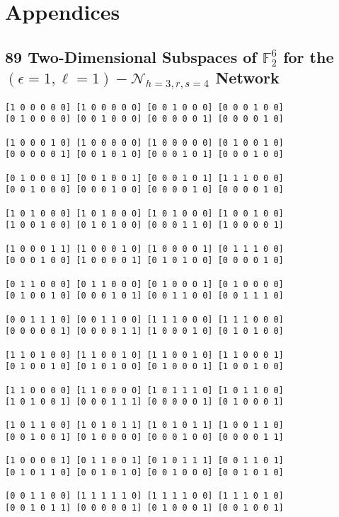 \chapter{Appendices} \label{chap:appendix}

\section{89 Two-Dimensional Subspaces of $\ensuremath{\mathbb{F}}_{2}^{6}$
for the $\left(\epsilon=1,\ell=1\right)-\mathcal{N}_{h=3,r,s=4}$
Network \label{sec:89-Two-Dimensional-Subspaces}}

\begin{lstlisting}
[1 0 0 0 0 0] [1 0 0 0 0 0] [0 0 1 0 0 0] [0 0 0 1 0 0] 
[0 1 0 0 0 0] [0 0 1 0 0 0] [0 0 0 0 0 1] [0 0 0 0 1 0] 

[1 0 0 0 1 0] [1 0 0 0 0 0] [1 0 0 0 0 0] [0 1 0 0 1 0] 
[0 0 0 0 0 1] [0 0 1 0 1 0] [0 0 0 1 0 1] [0 0 0 1 0 0] 

[0 1 0 0 0 1] [0 0 1 0 0 1] [0 0 0 1 0 1] [1 1 1 0 0 0] 
[0 0 1 0 0 0] [0 0 0 1 0 0] [0 0 0 0 1 0] [0 0 0 0 1 0] 

[1 0 1 0 0 0] [1 0 1 0 0 0] [1 0 1 0 0 0] [1 0 0 1 0 0] 
[1 0 0 1 0 0] [0 1 0 1 0 0] [0 0 0 1 1 0] [1 0 0 0 0 1] 

[1 0 0 0 1 1] [1 0 0 0 1 0] [1 0 0 0 0 1] [0 1 1 1 0 0] 
[0 0 0 1 0 0] [1 0 0 0 0 1] [0 1 0 1 0 0] [0 0 0 0 1 0] 

[0 1 1 0 0 0] [0 1 1 0 0 0] [0 1 0 0 0 1] [0 1 0 0 0 0] 
[0 1 0 0 1 0] [0 0 0 1 0 1] [0 0 1 1 0 0] [0 0 1 1 1 0] 

[0 0 1 1 1 0] [0 0 1 1 0 0] [1 1 1 0 0 0] [1 1 1 0 0 0] 
[0 0 0 0 0 1] [0 0 0 0 1 1] [1 0 0 0 1 0] [0 1 0 1 0 0] 

[1 1 0 1 0 0] [1 1 0 0 1 0] [1 1 0 0 1 0] [1 1 0 0 0 1] 
[0 1 0 0 1 0] [0 1 0 1 0 0] [0 1 0 0 0 1] [1 0 0 1 0 0] 

[1 1 0 0 0 0] [1 1 0 0 0 0] [1 0 1 1 1 0] [1 0 1 1 0 0] 
[1 0 1 0 0 1] [0 0 0 1 1 1] [0 0 0 0 0 1] [0 1 0 0 0 1] 

[1 0 1 1 0 0] [1 0 1 0 1 1] [1 0 1 0 1 1] [1 0 0 1 1 0] 
[0 0 1 0 0 1] [0 1 0 0 0 0] [0 0 0 1 0 0] [0 0 0 0 1 1] 

[1 0 0 0 0 1] [0 1 1 0 0 1] [0 1 0 1 1 1] [0 0 1 1 0 1] 
[0 1 0 1 1 0] [0 0 1 0 1 0] [0 0 1 0 0 0] [0 0 1 0 1 0] 

[0 0 1 1 0 0] [1 1 1 1 1 0] [1 1 1 1 0 0] [1 1 1 0 1 0] 
[0 0 1 0 1 1] [0 0 0 0 0 1] [0 1 0 0 0 1] [0 0 1 0 0 1] 


\end{lstlisting}
